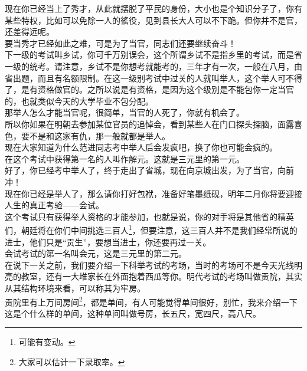 \begin{multicols}{\theparacolNo}
现在你已经当上了秀才，从此就摆脱了平民的身份，大小也是个知识分子了，你有某些特权，比如可以免除一人的徭役，见到县长大人可以不下跪。但你并不是官，还差得远呢。\\

要当秀才已经如此之难，可是为了当官，同志们还要继续奋斗！\\

下一级的考试叫乡试，你可千万别误会，这个所谓乡试不是指乡里的考试，而是省一级的统考。请注意，乡试不是你想考就能考的，三年才有一次，一般在八月，由省出题，而且有名额限制。在这一级别考试中过关的人就叫举人，这个举人可不得了，是有资格做官的。之所以说是有资格，是因为这个级别是不能包你一定当官的，也就类似今天的大学毕业不包分配。\\

那举人怎么才能当官呢，很简单，当官的人死了，你就有机会了。\\

所以你如果在明朝去参加某位官员的追悼会，看到某些人在门口探头探脑，面露喜色，要不是和这家有仇，那一般就都是举人。\\

现在大家知道为什么范进同志考中举人后会发疯吧，换了你也可能会疯的。\\

在这个考试中获得第一名的人叫作解元。这就是三元里的第一元。\\

好了，你已经考中举人了，终于走出了省城，现在向京城出发，为了当官，向前冲！\\

现在你已经是举人了，那么请你打好包袱，准备好笔墨纸砚，明年二月你将要迎接人生的真正考验——会试。\\

这个考试只有获得举人资格的才能参加，也就是说，你的对手将是其他省的精英们，朝廷将在你们中间挑选三百人\footnote{可能有变动。}，但要注意，这三百人并不是我们经常所说的进士，他们只是“贡生”，要想当进士，你还要再过一关。\\

会试考试的第一名叫会元，这是三元里的第二元。\\

在说下一关之前，我们要介绍一下科举考试的考场，当时的考场可不是今天光线明亮的教室，还有一大堆家长在外面抱着西瓜等你。明代考试的考场叫做贡院，其实从其结构环境来看，可以称其为牢房。\\

贡院里有上万间房间\footnote{大家可以估计一下录取率。}，都是单间，有人可能觉得单间很好，别忙，我来介绍一下这是个什么样的单间，这种单间叫做号房，长五尺，宽四尺，高八尺。\\


\end{multicols}

